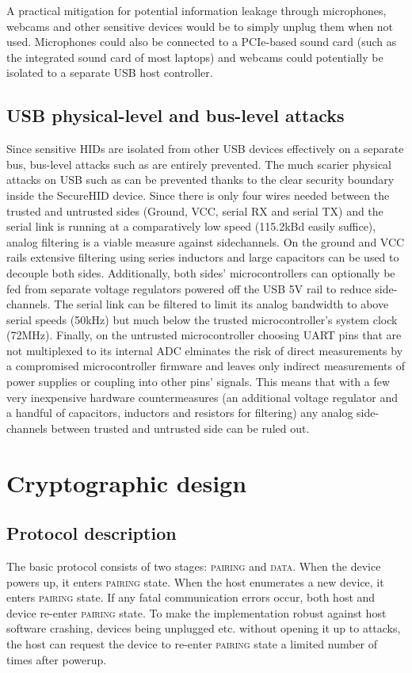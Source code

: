 \documentclass[12pt,a4paper,notitlepage]{article}
\begin{document}
A practical mitigation for potential information leakage through microphones, webcams and other sensitive devices would
be to simply unplug them when not used. Microphones could also be connected to a PCIe-based sound card (such as the
integrated sound card of most laptops) and webcams could potentially be isolated to a separate USB host controller.

\subsection{USB physical-level and bus-level attacks}
Since sensitive HIDs are isolated from other USB devices effectively on a separate bus, bus-level attacks such as
\textcite{neugschwandtner01} are entirely prevented. The much scarier physical attacks on USB such as \textcite{su01}
can be prevented thanks to the clear security boundary inside the SecureHID device. Since there is only four wires
needed between the trusted and untrusted sides (Ground, VCC, serial RX and serial TX) and the serial link is running at
a comparatively low speed (115.2kBd easily suffice), analog filtering is a viable measure against sidechannels. On the
ground and VCC rails extensive filtering using series inductors and large capacitors can be used to decouple both sides.
Additionally, both sides' microcontrollers can optionally be fed from separate voltage regulators powered off the USB 5V
rail to reduce side-channels. The serial link can be filtered to limit its analog bandwidth to above serial speeds
(50kHz) but much below the trusted microcontroller's system clock (72MHz). Finally, on the untrusted microcontroller
choosing UART pins that are not multiplexed to its internal ADC elminates the risk of direct measurements by a
compromised microcontroller firmware and leaves only indirect measurements of power supplies or coupling into other
pins' signals. This means that with a few very inexpensive hardware countermeasures (an additional voltage regulator and
a handful of capacitors, inductors and resistors for filtering) any analog side-channels between trusted and untrusted
side can be ruled out.

\section{Cryptographic design}

\subsection{Protocol description}
\label{prot_desc}
The basic protocol consists of two stages: \textsc{pairing} and \textsc{data}. When the device powers up, it enters
\textsc{pairing} state. When the host enumerates a new device, it enters \textsc{pairing} state. If any fatal
communication errors occur, both host and device re-enter \textsc{pairing} state. To make the implementation robust
against host software crashing, devices being unplugged etc. without opening it up to attacks, the host can request the
device to re-enter \textsc{pairing} state a limited number of times after powerup.
\end{document}
